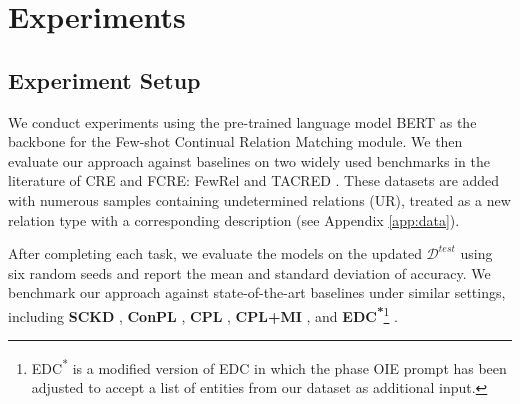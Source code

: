 \begin{table}[ht]
    \centering
    \caption{Ablation study of loss at task $\mathcal{T}^8$}
    \label{tab:ablation_study}
\end{table}

\section{Experiments}
\subsection{Experiment Setup}

We conduct experiments using the pre-trained language model BERT \citep{devlin-etal-2019-bert} as the backbone for the Few-shot Continual Relation Matching module. We then evaluate our approach against baselines on two widely used benchmarks in the literature of CRE and FCRE: FewRel \citep{han-etal-2018-fewrel} and TACRED \citep{zhang-etal-2017-position}. These datasets are added with numerous samples containing undetermined relations (UR), treated as a new relation type with a corresponding description (see Appendix \ref{app:data}).  

After completing each task, we evaluate the models on the updated $\mathcal{D}^{test}$ using six random seeds and report the mean and standard deviation of accuracy. We benchmark our approach against state-of-the-art baselines under similar settings, including \textbf{SCKD} \citep{wang-etal-2023-serial}, \textbf{ConPL} \citep{DBLP:conf/acl/ChenWS23}, \textbf{CPL} \citep{ma-etal-2024-making}, \textbf{CPL+MI} \citep{tran-etal-2024-preserving}, and \textbf{EDC\textsuperscript{*}}\footnote{EDC\textsuperscript{*} is a modified version of EDC in which the phase OIE prompt has been adjusted to accept a list of entities from our dataset as additional input.} \citep{zhang-soh-2024-extract}.

